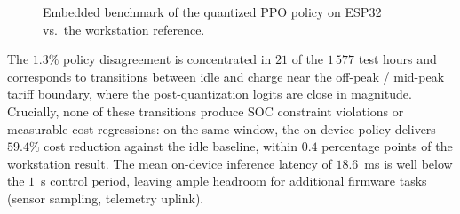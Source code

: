 \documentclass[conference]{IEEEtran}
\begin{document}
\begin{figure}[!ht]
    \centering
    \begin{minipage}{0.48\linewidth}
    \centering
    \end{minipage}\hfill
    \begin{minipage}{0.48\linewidth}
    \centering
    \end{minipage}
    \caption{Embedded benchmark of the quantized PPO policy on ESP32 vs.\ the workstation reference.}
    \label{fig:esp32_benchmark}
\end{figure}

The $1.3\%$ policy disagreement is concentrated in $21$ of the $1\,577$ test hours and corresponds to transitions between idle and charge near the off-peak / mid-peak tariff boundary, where the post-quantization logits are close in magnitude. Crucially, none of these transitions produce SOC constraint violations or measurable cost regressions: on the same window, the on-device policy delivers $59.4\%$ cost reduction against the idle baseline, within $0.4$ percentage points of the workstation result. The mean on-device inference latency of $18.6$~ms is well below the $1$~s control period, leaving ample headroom for additional firmware tasks (sensor sampling, telemetry uplink).
\end{document}
